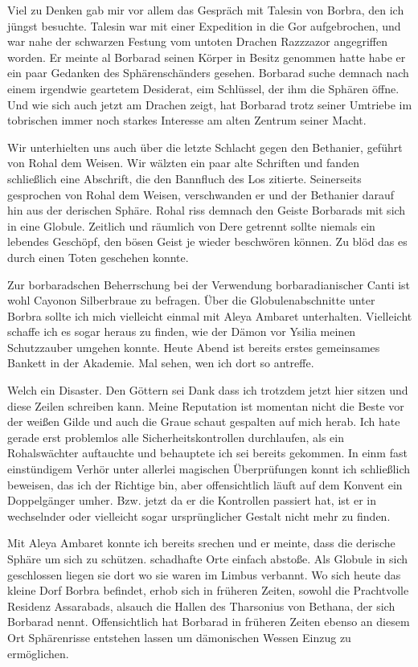 Viel zu Denken gab mir vor allem das Gespräch mit Talesin von Borbra, den ich jüngst besuchte. Talesin war mit einer Expedition in die Gor aufgebrochen, und war nahe der schwarzen Festung vom untoten Drachen Razzzazor angegriffen worden.
Er meinte al Borbarad seinen Körper in Besitz genommen hatte habe er ein paar Gedanken des Sphärenschänders gesehen. Borbarad suche demnach nach einem irgendwie geartetem Desiderat, eim Schlüssel, der ihm die Sphären öffne. Und wie sich auch jetzt am Drachen zeigt, hat Borbarad trotz seiner Umtriebe im tobrischen immer noch starkes Interesse am alten Zentrum seiner Macht.

Wir unterhielten uns auch über die letzte Schlacht gegen den Bethanier, geführt von Rohal dem Weisen. Wir wälzten ein paar alte Schriften und fanden schließlich eine Abschrift, die den Bannfluch des Los zitierte. Seinerseits gesprochen von Rohal dem Weisen, verschwanden er und der Bethanier darauf hin aus der derischen Sphäre. Rohal riss demnach den Geiste Borbarads mit sich in eine Globule. Zeitlich und räumlich von Dere getrennt sollte niemals ein lebendes Geschöpf, den bösen Geist je wieder beschwören können. Zu blöd das es durch einen Toten geschehen konnte.

Zur borbaradschen Beherrschung bei der Verwendung borbaradianischer Canti ist wohl Cayonon Silberbraue zu befragen. Über die Globulenabschnitte unter Borbra sollte ich mich vielleicht einmal mit Aleya Ambaret unterhalten. Vielleicht schaffe ich es sogar heraus zu finden, wie der Dämon vor Ysilia meinen Schutzzauber umgehen konnte.
Heute Abend ist bereits erstes gemeinsames Bankett in der Akademie. Mal sehen, wen ich dort so antreffe.

Welch ein Disaster. Den Göttern sei Dank dass ich trotzdem jetzt hier sitzen und diese Zeilen schreiben kann.
Meine Reputation ist momentan nicht die Beste vor der weißen Gilde und auch die Graue schaut gespalten auf mich herab. Ich hate gerade erst problemlos alle Sicherheitskontrollen durchlaufen, als ein Rohalswächter auftauchte und behauptete ich sei bereits gekommen. In einm fast einstündigem Verhör unter allerlei magischen Überprüfungen konnt ich schließlich beweisen, das ich der Richtige bin, aber offensichtlich läuft auf dem Konvent ein Doppelgänger umher. Bzw. jetzt da er die Kontrollen passiert hat, ist er in wechselnder oder vielleicht sogar ursprünglicher Gestalt nicht mehr zu finden.

Mit Aleya Ambaret konnte ich bereits srechen und er meinte, dass die derische Sphäre um sich zu schützen. schadhafte Orte einfach abstoße. Als Globule in sich geschlossen liegen sie dort wo sie waren im Limbus verbannt. Wo sich heute das kleine Dorf Borbra befindet, erhob sich in früheren Zeiten, sowohl die Prachtvolle Residenz Assarabads, alsauch die Hallen des Tharsonius von Bethana, der sich Borbarad nennt. Offensichtlich hat Borbarad in früheren Zeiten ebenso an diesem Ort Sphärenrisse entstehen lassen um dämonischen Wessen Einzug zu ermöglichen.

